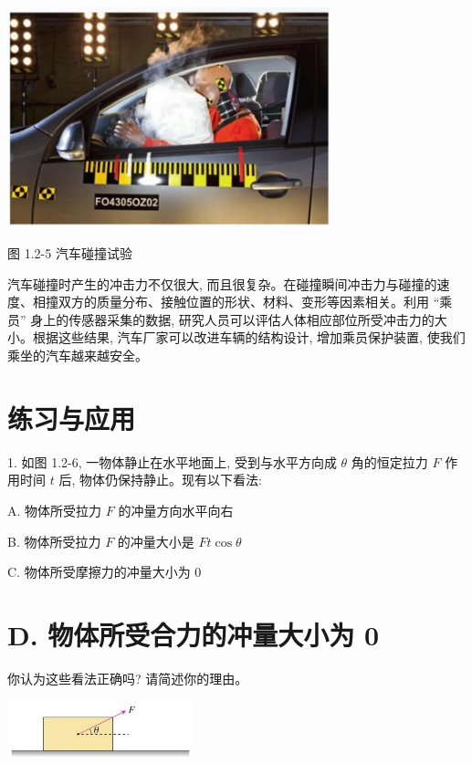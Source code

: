 \documentclass[10pt]{article}
\begin{document}
\begin{center}
\includegraphics[max width=0.7\textwidth]{images/01910e4c-ebb8-7d2c-8f2f-2375bc1d2d12_15_862727.jpg}
\end{center}

图 1.2-5 汽车碰撞试验

汽车碰撞时产生的冲击力不仅很大, 而且很复杂。在碰撞瞬间冲击力与碰撞的速度、相撞双方的质量分布、接触位置的形状、材料、变形等因素相关。利用 “乘员” 身上的传感器采集的数据, 研究人员可以评估人体相应部位所受冲击力的大小。根据这些结果, 汽车厂家可以改进车辆的结构设计, 增加乘员保护装置, 使我们乘坐的汽车越来越安全。

\section*{练习与应用}

1. 如图 1.2-6, 一物体静止在水平地面上, 受到与水平方向成 \(\theta\) 角的恒定拉力 \(F\) 作用时间 \(t\) 后, 物体仍保持静止。现有以下看法:

A. 物体所受拉力 \(F\) 的冲量方向水平向右

B. 物体所受拉力 \(F\) 的冲量大小是 \({Ft}\cos \theta\)

C. 物体所受摩擦力的冲量大小为 0

\section*{D. 物体所受合力的冲量大小为 0}

你认为这些看法正确吗? 请简述你的理由。

\begin{center}
\includegraphics[max width=0.4\textwidth]{images/01910e4c-ebb8-7d2c-8f2f-2375bc1d2d12_15_358424.jpg}
\end{center}
\end{document}

